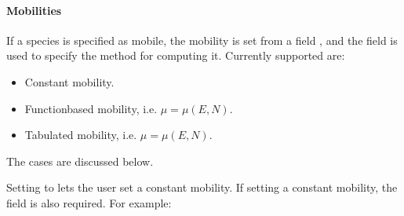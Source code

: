 \documentclass[letterpaper,10pt,english]{sphinxmanual}
\begin{document}
\begin{sphinxVerbatim}[commandchars=\\\{\},formatcom=\scriptsize]
           \PYG{p}{]}
          
            
            
            
            
            
            
            
            
  \PYG{p}{]}
\end{sphinxVerbatim}


\paragraph{Mobilities}
\label{\detokenize{Applications/CdrPlasmaModel:mobilities}}\label{\detokenize{Applications/CdrPlasmaModel:chap-cdrplasmajsonmobility}}
If a species is specified as mobile, the mobility is set from a field , and the field  is used to specify the method for computing it.
Currently supported are:
\begin{itemize}
\item {} 
Constant mobility.

\item {} 
Function\sphinxhyphen{}based mobility, i.e. \(\mu = \mu(E,N)\).

\item {} 
Tabulated mobility, i.e. \(\mu = \mu(E,N)\).

\end{itemize}

The cases are discussed below.


Setting  to  lets the user set a constant mobility.
If setting a constant mobility, the field  is also required.
For example:
\end{document}
